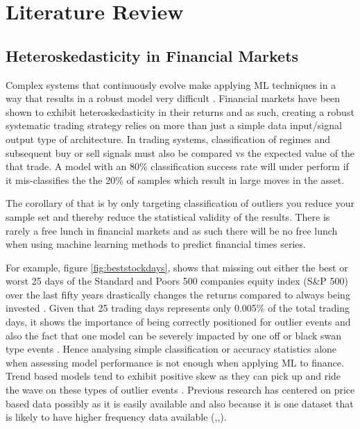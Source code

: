 \documentclass[11pt]{article}
\begin{document}
\section{Literature Review} \label{LitRev}


\subsection{Heteroskedasticity in Financial Markets}

Complex systems that continuously evolve make applying ML techniques in a way that results in a robust model very difficult \cite{Arnott2018}. Financial markets have been shown to exhibit heteroskedasticity in their returns \cite{Corhay1996} and as such, creating a robust systematic trading strategy relies on more than just a simple data input/signal output type of architecture. In trading systems, classification of regimes and subsequent buy or sell signals must also be compared vs the expected value of the that trade. A model with an 80\% classification success rate will under perform if it mis-classifies the the 20\% of samples which result in large moves in the asset. \par
 The corollary of that is by only targeting classification of outliers you reduce your sample set and thereby reduce the statistical validity of the results. There is rarely a free lunch in financial markets and as such there will be no free lunch when using machine learning methods to predict financial times series. 
\par
For example, figure \ref{fig:beststockdays}, shows that missing out either the best or worst 25 days of the Standard and Poors 500 companies equity index (S\&P 500) over the last fifty years drastically changes the returns compared to always being invested \cite{bestdays}. Given that 25 trading days represents only 0.005\% of the total trading days, it shows the importance of being correctly positioned for outlier events and also the fact that one model can be severely impacted by one off or black swan type events \cite{Taleb2007}. Hence analysing simple classification or accuracy statistics alone when assessing model performance is not enough when applying ML to finance. Trend based models tend to exhibit positive skew as they can pick up and ride the wave on these types of outlier events \cite{posskew}.
Previous research has centered on price based data possibly as it is easily available and also because it is one dataset that is likely to have higher frequency data available (\cite{Huang2005},\cite{Shen2012},\cite{Wang2014}). 
\end{document}
